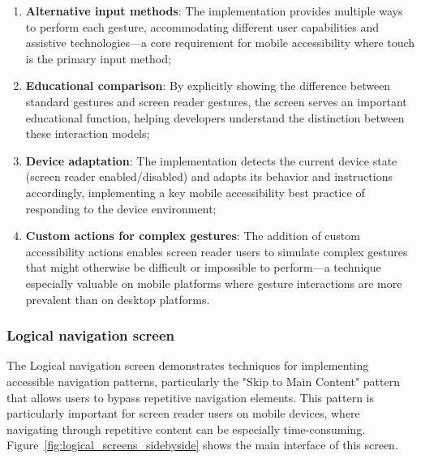\begin{enumerate}
    \item \textbf{Alternative input methods}: The implementation provides multiple ways to perform each gesture, accommodating different user capabilities and assistive technologies—a core requirement for mobile accessibility where touch is the primary input method;
    
    \item \textbf{Educational comparison}: By explicitly showing the difference between standard gestures and screen reader gestures, the screen serves an important educational function, helping developers understand the distinction between these interaction models;
    
    \item \textbf{Device adaptation}: The implementation detects the current device state (screen reader enabled/disabled) and adapts its behavior and instructions accordingly, implementing a key mobile accessibility best practice of responding to the device environment;
    
    \item \textbf{Custom actions for complex gestures}: The addition of custom accessibility actions enables screen reader users to simulate complex gestures that might otherwise be difficult or impossible to perform—a technique especially valuable on mobile platforms where gesture interactions are more prevalent than on desktop platforms.
\end{enumerate}

\subsubsection{Logical navigation screen}
\label{subsubsec:logical-navigation}

The Logical navigation screen demonstrates techniques for implementing accessible navigation patterns, particularly the "Skip to Main Content" pattern that allows users to bypass repetitive navigation elements. This pattern is particularly important for screen reader users on mobile devices, where navigating through repetitive content can be especially time-consuming. Figure~\ref{fig:logical_screens_sidebyside} shows the main interface of this screen.

